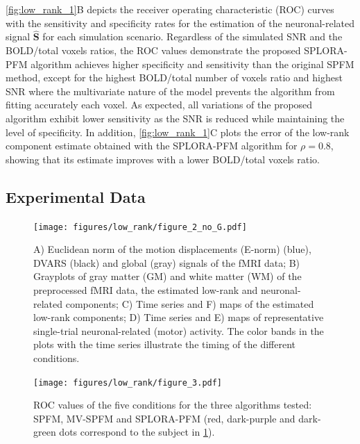 \cref{fig:low_rank_1}B depicts the receiver operating characteristic (ROC)
curves with the sensitivity and specificity rates for the estimation of the
neuronal-related signal $\mathbf{\hat{S}}$ for each simulation scenario.
Regardless of the simulated SNR and the BOLD/total voxels ratios, the ROC values
demonstrate the proposed SPLORA-PFM algorithm achieves higher specificity and
sensitivity than the original SPFM method, except for the highest BOLD/total
number of voxels ratio and highest SNR where the multivariate nature of the
model prevents the algorithm from fitting accurately each voxel. As expected,
all variations of the proposed algorithm exhibit lower sensitivity as the SNR is
reduced while maintaining the level of specificity. In addition,
\cref{fig:low_rank_1}C plots the error of the low-rank component estimate
obtained with the SPLORA-PFM algorithm for $\rho = 0.8$, showing that its
estimate improves with a lower BOLD/total voxels ratio.

\subsection{Experimental Data}

\begin{figure}[th!]
    \centering
    \texttt{[image: figures/low\_rank/figure\_2\_no\_G.pdf]}
    \caption{A) Euclidean norm of the motion displacements (E-norm) (blue),
    DVARS (black) and global (gray) signals of the fMRI data; B) Grayplots of
    gray matter (GM) and white matter (WM) of the preprocessed fMRI
    data, the estimated low-rank and neuronal-related components; C) Time series
    and F) maps of the estimated low-rank components; D) Time series and E) maps
    of representative single-trial neuronal-related (motor) activity. The color
    bands in the plots with the time series illustrate the timing of the
    different conditions.}
    \label{fig:low_rank_2}
\end{figure}


\begin{figure}[th!]
    \centering
    \texttt{[image: figures/low\_rank/figure\_3.pdf]}
    \caption{ROC values of the five conditions for the three algorithms tested:
    SPFM, MV-SPFM and SPLORA-PFM (red, dark-purple and dark-green dots
    correspond to the subject in \cref{fig:low_rank_2}).}
    \label{fig:low_rank_3}
\end{figure}


